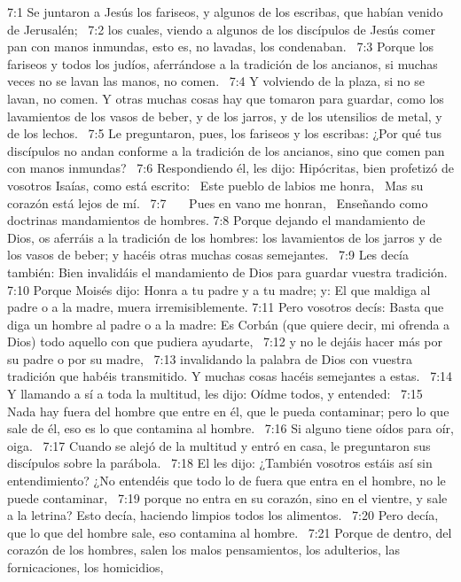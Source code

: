 7:1 Se juntaron a Jesús los fariseos, y algunos de los escribas, que habían venido de Jerusalén;  
7:2 los cuales, viendo a algunos de los discípulos de Jesús comer pan con manos inmundas, esto es, no lavadas, los condenaban.  
7:3 Porque los fariseos y todos los judíos, aferrándose a la tradición de los ancianos, si muchas veces no se lavan las manos, no comen.  
7:4 Y volviendo de la plaza, si no se lavan, no comen. Y otras muchas cosas hay que tomaron para guardar, como los lavamientos de los vasos de beber, y de los jarros, y de los utensilios de metal, y de los lechos.  
7:5 Le preguntaron, pues, los fariseos y los escribas: ¿Por qué tus discípulos no andan conforme a la tradición de los ancianos, sino que comen pan con manos inmundas?  
7:6 Respondiendo él, les dijo: Hipócritas, bien profetizó de vosotros Isaías, como está escrito:  
Este pueblo de labios me honra,  
Mas su corazón está lejos de mí.  
7:7    Pues en vano me honran,  
Enseñando como doctrinas mandamientos de hombres. 
7:8 Porque dejando el mandamiento de Dios, os aferráis a la tradición de los hombres: los lavamientos de los jarros y de los vasos de beber; y hacéis otras muchas cosas semejantes.  
7:9 Les decía también: Bien invalidáis el mandamiento de Dios para guardar vuestra tradición.  
7:10 Porque Moisés dijo: Honra a tu padre y a tu madre; y: El que maldiga al padre o a la madre, muera irremisiblemente. 
7:11 Pero vosotros decís: Basta que diga un hombre al padre o a la madre: Es Corbán (que quiere decir, mi ofrenda a Dios) todo aquello con que pudiera ayudarte,  
7:12 y no le dejáis hacer más por su padre o por su madre,  
7:13 invalidando la palabra de Dios con vuestra tradición que habéis transmitido. Y muchas cosas hacéis semejantes a estas.  
7:14 Y llamando a sí a toda la multitud, les dijo: Oídme todos, y entended:  
7:15 Nada hay fuera del hombre que entre en él, que le pueda contaminar; pero lo que sale de él, eso es lo que contamina al hombre.  
7:16 Si alguno tiene oídos para oír, oiga.  
7:17 Cuando se alejó de la multitud y entró en casa, le preguntaron sus discípulos sobre la parábola.  
7:18 El les dijo: ¿También vosotros estáis así sin entendimiento? ¿No entendéis que todo lo de fuera que entra en el hombre, no le puede contaminar,  
7:19 porque no entra en su corazón, sino en el vientre, y sale a la letrina? Esto decía, haciendo limpios todos los alimentos.  
7:20 Pero decía, que lo que del hombre sale, eso contamina al hombre.  
7:21 Porque de dentro, del corazón de los hombres, salen los malos pensamientos, los adulterios, las fornicaciones, los homicidios,  
